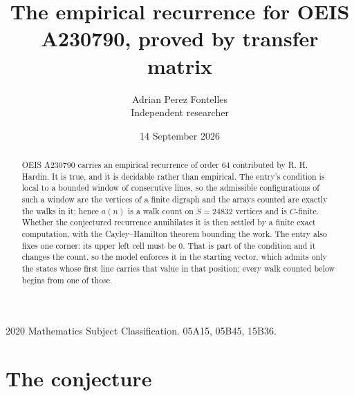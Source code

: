 \documentclass[11pt,a4paper]{article}
\title{The empirical recurrence for OEIS A230790, proved by transfer matrix}
\author{Adrian Perez Fontelles\\ \small Independent researcher}
\date{14 September 2026}
\theoremstyle{plain}
\theoremstyle{definition}
\begin{document}
\maketitle

\begin{abstract}
OEIS A230790 carries an empirical recurrence of order $64$ contributed by R. H. Hardin. It is
true, and it is decidable rather than empirical. The entry's condition is local to a bounded window of consecutive lines, so
the admissible configurations of such a window are the vertices of a finite digraph and the
arrays counted are exactly the walks in it; hence $a(n)$ is a walk count on $S=24832$ vertices
and is $C$-finite. Whether the conjectured recurrence annihilates it is then settled by a
finite exact computation, with the Cayley--Hamilton theorem bounding the work.
 The entry also fixes one corner: its upper left cell must be $0$. That is part of the condition and it changes the count, so the model enforces it in the starting vector, which admits only the states whose first line carries that value in that position; every walk counted below begins from one of those.\end{abstract}

\noindent\small 2020 Mathematics Subject Classification. 05A15, 05B45, 15B36.\normalsize

\section{The conjecture}
\end{document}
